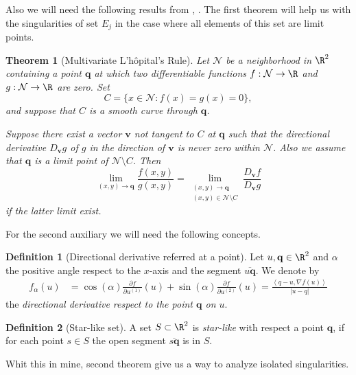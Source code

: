\documentclass[sort&compress, preprint]{elsarticle}
\theoremstyle{definition}
\newtheorem{dfn}{Definition}[section]
\theoremstyle{plain}%
\newtheorem{thm}{Theorem}[section]
\theoremstyle{remark}
\newcommand{\innerprod}[2]{\left\langle#1, #2\right\rangle}
\begin{document}
Also we will need the following results from \cite[Thm 2.1]{Lawlor2012}, \cite[Thm. 1]{FineAIandKass1966}.
The first theorem will help us  with the singularities of set $E_j$ in the case where all elements of this set
are limit points. 
\begin{thm}[Multivariate L'h\^{o}pital's Rule] \label{thm:Lawlor}
	Let $\mathcal{N}$ be a neighborhood in $\R^2$ containing a point $\mathbf{q}$ at which
	two differentiable functions $f:\mathcal{N}\to \R$ and $g:\mathcal{N}\to \R$ are zero.
	Set 
	$$
		C=\{x \in \mathcal{N}: f(x)=g(x)=0 \},
	$$
	and suppose that $C$ is a smooth curve through $\mathbf{q}$.
	
	Suppose	there exist a vector $\mathbf{v}$ not tangent to $C$ at $\mathbf{q}$
	such that the directional derivative $D_{\mathbf{v}}g$ of $g$ in the direction of $\mathbf{v}$ is never zero
	within $\mathcal{N}$. Also we assume that $\mathbf{q}$ is a limit point of $\mathcal{N}\setminus C$. Then
	\begin{equation*}
		\lim_{(x,y)\to \mathbf{q}}
		\frac{f(x,y)}{g(x,y)} =
		\lim_{
				\substack{
					(x,y)\to \mathbf{q}\\ 
					(x,y)\in \mathcal{N} \setminus C
				}
		}
		\frac{D_{\mathbf{v}} f }{D_{\mathbf{v}} g}
	\end{equation*}
	if the latter limit exist.
\end{thm}
For the second auxiliary we will need the following concepts.
\begin{dfn}[Directional derivative referred at a point]
	Let $u,\mathbf{q}\in \R^2$ and $\alpha$ the positive angle respect to the $x$-axis and the segment
	$\overline{u \mathbf{q}}$.	We denote by 
	\begin{align*}
		f_{\alpha}(u) &= 
			\cos(\alpha) 		
			\frac{\partial f}{\partial u^{(1)}}(u) + 
			\sin(\alpha)
			\frac{\partial f}{\partial u^{(2)}}(u) 
			= \frac{ \innerprod{q-u}{\nabla f(u)}}{|u-q|}			
	\end{align*}
	the \emph{directional derivative respect to the point $\mathbf{q}$ on $u$}.
\end{dfn}
\begin{dfn}[Star-like set]
	A set $S\subset \R^2$ is \emph{star-like} with respect a point $\mathbf{q}$, if for each point $s \in S$ the open 
	segment $\overline{s \mathbf{q}}$ is in $S$.
\end{dfn}
%
Whit this in mine, second theorem give us a way to analyze isolated singularities.
\end{document}
